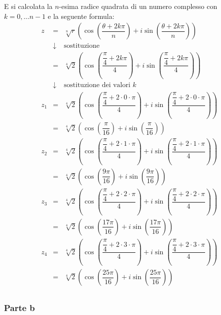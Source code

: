 \documentclass[a4paper]{article}
\begin{document}
	\noindent
	E si calcolata la $n$-esima radice quadrata di un numero complesso con $k = 0, ... n-1$ e la seguente formula:
	\begin{equation*}
		\begin{array}{rll}
			z &=& \sqrt[n]{r}\left(\cos\left(\dfrac{\theta + 2 k \pi}{n}\right) + i \sin\left(\dfrac{\theta + 2 k \pi}{n}\right) \right) \\ [2em]
			&\downarrow& \text{sostituzione} \\ [1.5em]
			&=& \sqrt[4]{2}\left(\cos\left(\dfrac{\dfrac{\pi}{4} + 2 k \pi}{4}\right) + i \sin\left(\dfrac{\dfrac{\pi}{4} + 2 k \pi}{4}\right)\right) \\ [2em]
			&\downarrow& \text{sostituzione dei valori }k \\ [1.5em]
			z_{1} &=& \sqrt[4]{2}\left(\cos\left(\dfrac{\dfrac{\pi}{4} + 2 \cdot 0 \cdot \pi}{4}\right) + i \sin\left(\dfrac{\dfrac{\pi}{4} + 2 \cdot 0 \cdot \pi}{4}\right)\right) \\ [2em]
			&=& \sqrt[4]{2}\left(\cos\left(\dfrac{\pi}{16}\right) + i \sin\left(\dfrac{\pi}{16}\right)\right) \\ [1.5em]
			z_{2} &=& \sqrt[4]{2}\left(\cos\left(\dfrac{\dfrac{\pi}{4} + 2 \cdot 1 \cdot \pi}{4}\right) + i \sin\left(\dfrac{\dfrac{\pi}{4} + 2 \cdot 1 \cdot \pi}{4}\right)\right) \\ [2em]
			&=& \sqrt[4]{2}\left(\cos\left(\dfrac{9\pi}{16}\right) + i \sin\left(\dfrac{9\pi}{16}\right)\right) \\ [1.5em]
			z_{3} &=& \sqrt[4]{2}\left(\cos\left(\dfrac{\dfrac{\pi}{4} + 2 \cdot 2 \cdot \pi}{4}\right) + i \sin\left(\dfrac{\dfrac{\pi}{4} + 2 \cdot 2 \cdot \pi}{4}\right)\right) \\ [2em]
			&=& \sqrt[4]{2}\left(\cos\left(\dfrac{17\pi}{16}\right) + i \sin\left(\dfrac{17\pi}{16}\right)\right) \\ [1.5em]
			z_{4} &=& \sqrt[4]{2}\left(\cos\left(\dfrac{\dfrac{\pi}{4} + 2 \cdot 3 \cdot \pi}{4}\right) + i \sin\left(\dfrac{\dfrac{\pi}{4} + 2 \cdot 3 \cdot \pi}{4}\right)\right) \\ [2em]
			&=& \sqrt[4]{2}\left(\cos\left(\dfrac{25\pi}{16}\right) + i \sin\left(\dfrac{25\pi}{16}\right)\right) \\ [1.5em]
		\end{array}
	\end{equation*}\newpage

	\subsubsection{Parte b}
	
\end{document}

